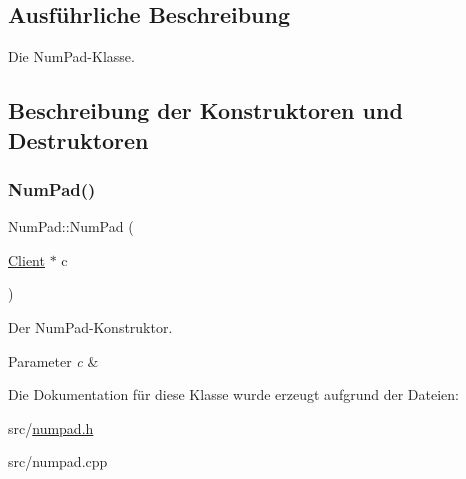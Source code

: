 \subsection{Ausführliche Beschreibung}
Die Num\+Pad-\/\+Klasse. 

\subsection{Beschreibung der Konstruktoren und Destruktoren}
\hypertarget{class_num_pad_ac35bfd6bb99a182c9073d80a09f3baf9}{}\label{class_num_pad_ac35bfd6bb99a182c9073d80a09f3baf9} 
\subsubsection{\texorpdfstring{Num\+Pad()}{NumPad()}}
{\footnotesize\ttfamily Num\+Pad\+::\+Num\+Pad (\begin{DoxyParamCaption}\item[{\hyperlink{class_client}{Client} $\ast$}]{c }\end{DoxyParamCaption})\hspace{0.3cm}{\ttfamily [explicit]}}



Der Num\+Pad-\/\+Konstruktor. 


\begin{DoxyParams}{Parameter}
{\em c} & \\
\hline
\end{DoxyParams}


Die Dokumentation für diese Klasse wurde erzeugt aufgrund der Dateien\+:\begin{DoxyCompactItemize}
\item 
src/\hyperlink{numpad_8h}{numpad.\+h}\item 
src/numpad.\+cpp\end{DoxyCompactItemize}
